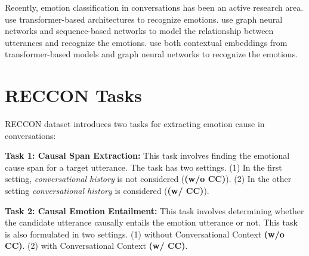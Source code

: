 \documentclass{article}
\begin{document}
Recently, emotion classification in conversations has been an active research area. \citet{wang2020contextualized, shen2020dialogxl, chapuis2020hierarchical} use transformer-based architectures to recognize emotions. \citet{sheng2020summarize, ghosal2019dialoguegcn, zhong2019knowledge} use graph neural networks and sequence-based networks to model the relationship between utterances and recognize the emotions. \citet{ishiwatari2020relation} use both contextual embeddings from transformer-based models and graph neural networks to recognize the emotions. 

%
 \section{RECCON Tasks}\label{sec:problem}
\vspace{-3mm}

RECCON dataset introduces two tasks for extracting emotion cause in conversations:

\noindent\textbf{Task 1: Causal Span Extraction:} This task involves finding the emotional cause span for a target utterance. The task has two settings. (1) In the first setting,  \textit{conversational history} is not considered (\textbf{(w/o CC)}). (2) In the other setting \textit{conversational history} is considered (\textbf{(w/ CC)}). 

\noindent\textbf{Task 2: Causal Emotion Entailment:} This task involves determining whether the candidate utterance causally entails the emotion utterance or not. This task is also formulated in two settings. (1) without Conversational Context \textbf{(w/o CC)}. (2) with Conversational Context \textbf{(w/ CC)}. 
\end{document}
